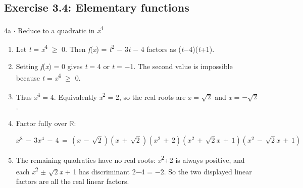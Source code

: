 \documentclass[11pt]{article}
\begin{document}
\begin{keepsection}\subsection{Exercise 3.4: Elementary functions}

\begin{workedbox}{4a \ensuremath{\cdot} Reduce to a quadratic in \textit{x}\textsuperscript{4}}
\begin{enumerate}
\item Let \textit{t} = \textit{x}\textsuperscript{4} \ensuremath{\geq} 0. Then \textit{f}(\textit{x}) = \textit{t}\textsuperscript{2} \ensuremath{-} 3\textit{t} \ensuremath{-} 4 factors as (\textit{t}\ensuremath{-}4)(\textit{t}+1).
\item Setting \textit{f}(\textit{x}) = 0 gives \textit{t} = 4 or \textit{t} = \ensuremath{-}1. The second value is impossible because \textit{t} = \textit{x}\textsuperscript{4} \ensuremath{\geq} 0.
\item Thus \textit{x}\textsuperscript{4} = 4. Equivalently \textit{x}\textsuperscript{2} = 2, so the real roots are \textit{x} = \ensuremath{\sqrt{2}} and \textit{x} = \ensuremath{-}\ensuremath{\sqrt{2}}.
\item {}
Factor fully over \ensuremath{\mathbb{R}}:

\begin{equation*}{x}^{8}\, -\, 3{x}^{4}\, -\, 4\, =\, ({x}\, -\, \sqrt{2})({x}\, +\, \sqrt{2})({x}^{2}\, +\, 2)({x}^{2}\, +\, \sqrt{2}{x}\, +\, 1)({x}^{2}\, -\, \sqrt{2}{x}\, +\, 1)\end{equation*}
\item The remaining quadratics have no real roots: \textit{x}\textsuperscript{2}+2 is always positive, and each \textit{x}\textsuperscript{2} \ensuremath{\pm} \ensuremath{\sqrt{2}}\textit{x} + 1 has discriminant 2\ensuremath{-}4 = \ensuremath{-}2. So the two displayed linear factors are all the real linear factors.
\end{enumerate}
\end{workedbox}

\end{keepsection}
\end{document}
